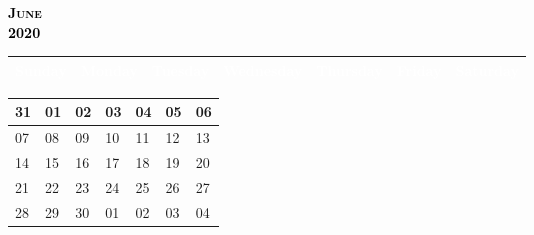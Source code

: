 \documentclass{article}
\newcommand{\daysize}{2.5cm}		%
\newcommand{\dw}{3.5cm}					%
\newcommand{\mkday}[1]{
  #1
  \vspace{\daysize}
}
\begin{document}
		\begin{center}
			\textsc{\LARGE \textbf{\textcolor{black}{
			June
			}}}\\ %
			\textsc{\large \textbf{\textcolor{black}{
			2020
			}}} %
		\end{center}

		\begin{center}
		\begin{tabular}{| p{\dw} | p{\dw} | p{\dw} | p{\dw} | p{\dw} | p{\dw} | p{\dw} |}
			\hline
			\cellcolor{bannercolor} \textcolor{white}{Sunday} &
			\cellcolor{bannercolor} \textcolor{white}{Monday} &
			\cellcolor{bannercolor} \textcolor{white}{Tuesday} &
			\cellcolor{bannercolor} \textcolor{white}{Wednesday} &
			\cellcolor{bannercolor} \textcolor{white}{Thursday} &
			\cellcolor{bannercolor} \textcolor{white}{Friday} &
			\cellcolor{bannercolor} \textcolor{white}{Saturday} \\
			\hline
		\end{tabular}

		\vspace{0.1cm}

		\begin{tabular}{| p{\dw} | p{\dw} | p{\dw} | p{\dw} | p{\dw} | p{\dw} | p{\dw} |}
\hline 
\cellcolor{weekendcolor}\mkday{
    31
} & 
\mkday{
    01
} &
\mkday{
    02
} &
\mkday{
    03
} &
\mkday{
    04
} &
\mkday{
    05
} &
\cellcolor{weekendcolor}\mkday{
    06
} 
\\
\hline 
\cellcolor{weekendcolor}\mkday{
    07
} & 
\mkday{
    08
} &
\mkday{
    09
} &
\mkday{
    10
} &
\mkday{
    11
} &
\mkday{
    12
} &
\cellcolor{weekendcolor}\mkday{
    13
} 
\\
\hline 
\cellcolor{weekendcolor}\mkday{
    14
} & 
\mkday{
    15
} &
\mkday{
    16
} &
\mkday{
    17
} &
\mkday{
    18
} &
\mkday{
    19
} &
\cellcolor{weekendcolor}\mkday{
    20
} 
\\
\hline 
\cellcolor{weekendcolor}\mkday{
    21
} & 
\mkday{
    22
} &
\mkday{
    23
} &
\mkday{
    24
} &
\mkday{
    25
} &
\mkday{
    26
} &
\cellcolor{weekendcolor}\mkday{
    27
} 
\\
\hline 
\cellcolor{weekendcolor}\mkday{
    28
} & 
\mkday{
    29
} &
\mkday{
    30
} &
\mkday{
    01
} &
\mkday{
    02
} &
\mkday{
    03
} &
\cellcolor{weekendcolor}\mkday{
    04
} 
\\
		\end{tabular}

		\end{center}
\end{document}
